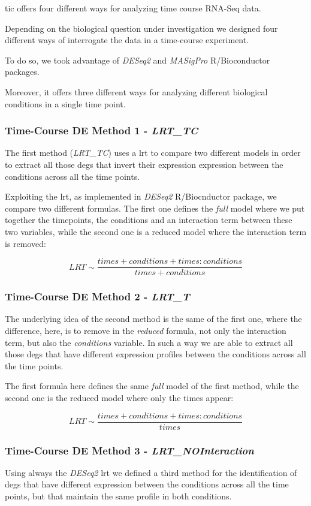 \gls{tic} offers four different ways for analyzing time course RNA-Seq data.


Depending on the biological question under investigation we designed four different ways of interrogate the data in a time-course experiment.

To do so, we took advantage of \textit{DESeq2}\cite{Love2014} and \textit{MASigPro}\cite{Nueda2014} R/Bioconductor packages.

Moreover, it offers three different ways for analyzing different biological conditions in a single time point.

\subsubsection{Time-Course DE Method 1 - \textit{LRT\_TC}}
The first method (\textit{LRT\_TC}) uses a \gls{lrt} to compare two different models in order to extract all those \glspl{deg} that invert their expression expression between the conditions across all the time points.

Exploiting the \gls{lrt}, as implemented in \textit{DESeq2} R/Biocnductor package, we compare two different formulas.
The first one defines the \textit{full} model where we put together the timepoints, the conditions and an interaction term between these two variables, while the second one is a reduced model where the interaction term is removed:

\[LRT \sim \frac{times+conditions+times:conditions}{times+conditions}\]


\subsubsection{Time-Course DE Method 2 - \textit{LRT\_T}}
The underlying idea of the second method is the same of the first one, where the difference, here, is to remove in the \textit{reduced} formula, not only the interaction term, but also the \textit{conditions} variable.
In such a way we are able to extract all those \glspl{deg} that have different expression profiles between the conditions across all the time points.

The first formula here defines the same \textit{full} model of the first method, while the second one is the reduced model where only the times appear:

\[LRT \sim \frac{times+conditions+times:conditions}{times}\]


\subsubsection{Time-Course DE Method 3 - \textit{LRT\_NOInteraction}}
Using always the \textit{DESeq2} \gls{lrt} we defined a third method for the 
identification of \glspl{deg} that have different expression between the conditions across all the time points, but that maintain the same profile in both conditions.

